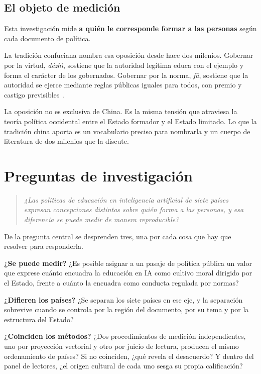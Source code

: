 \documentclass[12pt,letterpaper]{article}
\newcommand{\dezhi}{\textit{d\'ezh\`{\i}}}
\newcommand{\fa}{\textit{f\v{a}}}
\newcommand{\zhg}[1]{}
\begin{document}
\subsection{El objeto de medición}

Esta investigación mide \textbf{a quién le corresponde formar a las personas} según cada documento de política.

La tradición confuciana nombra esa oposición desde hace dos milenios. Gobernar por la virtud, \dezhi\zhg{德治}, sostiene que la autoridad legítima educa con el ejemplo y forma el carácter de los gobernados. Gobernar por la norma, \fa\zhg{法}, sostiene que la autoridad se ejerce mediante reglas públicas iguales para todos, con premio y castigo previsibles~\citep{pines2023legalism}.

La oposición no es exclusiva de China. Es la misma tensión que atraviesa la teoría política occidental entre el Estado formador y el Estado limitado. Lo que la tradición china aporta es un vocabulario preciso para nombrarla y un cuerpo de literatura de dos milenios que la discute.


\section{Preguntas de investigación}

\begin{quote}
\itshape
¿Las políticas de educación en inteligencia artificial de siete países expresan concepciones distintas sobre quién forma a las personas, y esa diferencia se puede medir de manera reproducible?
\end{quote}

De la pregunta central se desprenden tres, una por cada cosa que hay que resolver para responderla.

\begin{description}[leftmargin=1.8cm,style=nextline]
  \item[P1.] \textbf{¿Se puede medir?} ¿Es posible asignar a un pasaje de política pública un valor que exprese cuánto encuadra la educación en IA como cultivo moral dirigido por el Estado, frente a cuánto la encuadra como conducta regulada por normas?

  \item[P2.] \textbf{¿Difieren los países?} ¿Se separan los siete países en ese eje, y la separación sobrevive cuando se controla por la región del documento, por su tema y por la estructura del Estado?

  \item[P3.] \textbf{¿Coinciden los métodos?} ¿Dos procedimientos de medición independientes, uno por proyección vectorial y otro por juicio de lectura, producen el mismo ordenamiento de países? Si no coinciden, ¿qué revela el desacuerdo? Y dentro del panel de lectores, ¿el origen cultural de cada uno sesga su propia calificación?
\end{description}
\end{document}
